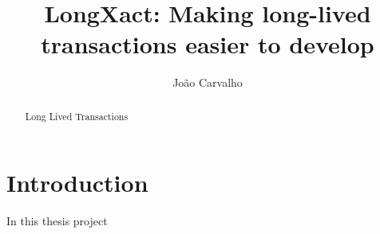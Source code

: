 \documentclass{llncs}
\begin{document}
\title{LongXact: Making long-lived transactions easier to develop}

\author{João Carvalho}
\maketitle


\begin{abstract}
Long Lived Transactions 
\end{abstract}


\section{Introduction}

In this thesis project
\end{document}
